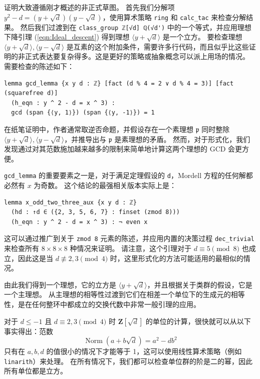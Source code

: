 \documentclass[sigplan,10pt,nonacm,
screen]{acmart} \settopmatter{printfolios=true,printccs=false,printacmref=false}
\newcommand{\ZZ}{\mathbf{Z}}
\DeclareMathOperator{\Norm}{Norm}
\begin{document}
证明大致遵循刚才概述的非正式草图。
首先我们分解项 $y^2 - d = (y + \sqrt{d})(y - \sqrt d)$，使用算术策略 \lstinline{ring} 和 \lstinline{calc_tac} 来检查分解结果。
%
然后我们过渡到在 \lstinline{class_group ℤ[√d] ℚ(√d')} 中的一个等式，并应用理想下降引理 (\ref{eqn:Ideal_descent}) 得到理想 $\langle y + \sqrt{d} \rangle$ 是一个立方。
要检查理想 $\langle y + \sqrt{d} \rangle,\langle y - \sqrt{d} \rangle$ 是互素的这个附加条件，需要许多行代码，而且似乎比这些证明的非正式表达要复杂得多。这是更好的策略或抽象概念可以派上用场的情况。
需要检查的陈述如下：
\begin{lstlisting}
lemma gcd_lemma {x y d : ℤ} [fact (d % 4 = 2 ∨ d % 4 = 3)] [fact (squarefree d)]
  (h_eqn : y ^ 2 - d = x ^ 3) :
  gcd (span {⟨y, 1⟩}) (span {⟨y, -1⟩}) = 1
\end{lstlisting}
在纸笔证明中，作者通常取逆否命题，并假设存在一个素理想 $\mathfrak p$ 同时整除 $\langle y + \sqrt{d} \rangle,\langle y - \sqrt{d} \rangle$，并推导出与 $\mathfrak p$ 是素理想的矛盾。
然而，对于形式化，我们发现通过对其范数施加越来越多的限制来简单地计算这两个理想的 GCD 会更方便。

\lstinline{gcd_lemma} 的重要要素之一是，对于满足定理假设的 \lstinline{d}，Mordell 方程的任何解都必然有 $x$ 为奇数。
这个结论的最强相关版本实际上是：
\begin{lstlisting}
lemma x_odd_two_three_aux {x y d : ℤ}
  (hd : ↑d ∈ ({2, 3, 5, 6, 7} : finset (zmod 8)))
  (h_eqn : y ^ 2 - d = x ^ 3) : ¬ even x
\end{lstlisting}
这可以通过推广到关于 \lstinline{zmod 8} 元素的陈述，并应用内置的决策过程 \lstinline{dec_trivial} 来检查所有 $8 \times 8 \times 8$ 种情况来证明。
请注意，这个引理对于 $d \equiv 5 \pmod 8$ 也成立，因此这是当 $d \not\equiv 2,3\pmod 4$ 时，这里形式化的方法可能适用的最相似的情况。

由此我们得到一个理想，它的立方是 $\langle y + \sqrt{d} \rangle$，并且根据关于类群的假设，它是一个主理想。
从主理想的相等性过渡到它们在相差一个单位下的生成元的相等性，是在任何整环中都成立的交换代数中非常一般引理的应用。

对于 $d \le -1$ 且 $d\equiv 2,3\pmod 4$ 时 $\ZZ[\sqrt d]$ 的单位的计算，很快就可以从以下事实得出：范数
$$\Norm(a+b \sqrt d) = a^2 - d b^2$$
只有在 $a,b,d$ 的值很小的情况下才能等于 1，这可以使用线性算术策略（例如 \lstinline{linarith}）来处理。
在所有情况下，我们都可以检查单位群的阶是二的幂，因此所有单位都是立方。
\end{document}
